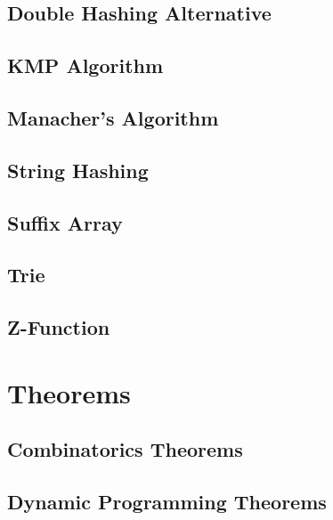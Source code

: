 \subsection{Double Hashing Alternative}
\raggedbottom
\hrulefill
\subsection{KMP Algorithm}
\raggedbottom
\hrulefill
\subsection{Manacher's Algorithm}
\raggedbottom
\hrulefill
\subsection{String Hashing}
\raggedbottom
\hrulefill
\subsection{Suffix Array}
\raggedbottom
\hrulefill
\subsection{Trie}
\raggedbottom
\hrulefill
\subsection{Z-Function}
\raggedbottom
\hrulefill

\section{Theorems}
\subsection{Combinatorics Theorems}
\raggedbottom
\hrulefill
\subsection{Dynamic Programming Theorems}
\raggedbottom
\hrulefill
